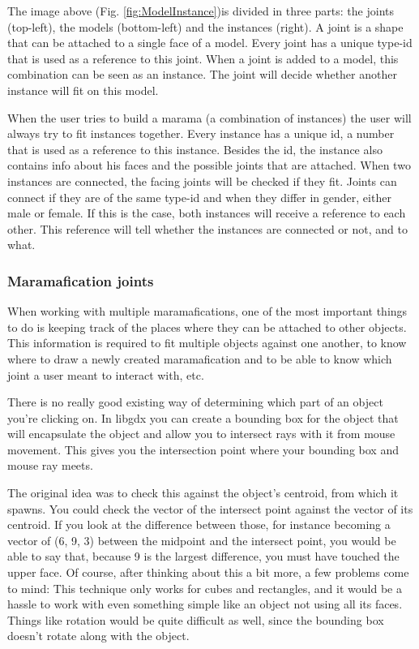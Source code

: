 \documentclass[10pt]{extarticle} %
\begin{document}
    The image above (Fig. \ref{fig:ModelInstance})is divided in three parts: the joints (top-left), the models (bottom-left) and the instances (right).
    A joint is a shape that can be attached to a single face of a model.
    Every joint has a unique type-id that is used as a reference to this joint.
    When a joint is added to a model, this combination can be seen as an instance.
    The joint will decide whether another instance will fit on this model.

    When the user tries to build a marama (a combination of instances) the user will always try to fit instances together.
    Every instance has a unique id, a number that is used as a reference to this instance.
    Besides the id, the instance also contains info about his faces and the possible joints that are attached.
    When two instances are connected, the facing joints will be checked if they fit.
    Joints can connect if they are of the same type-id and when they differ in gender, either male or female.
    If this is the case, both instances will receive a reference to each other.
    This reference will tell whether the instances are connected or not, and to what.

    \subsubsection{Maramafication joints}
    When working with multiple maramafications, one of the most important things to do is keeping track of the places where they can be attached to other objects.
    This information is required to fit multiple objects against one another, to know where to draw a newly created maramafication and to be able to know which joint a user meant to interact with, etc.

    There is no really good existing way of determining which part of an object you're clicking on.
    In libgdx you can create a bounding box for the object that will encapsulate the object and allow you to intersect rays with it from mouse movement.
    This gives you the intersection point where your bounding box and mouse ray meets.

    The original idea was to check this against the object's centroid, from which it spawns.
    You could check the vector of the intersect point against the vector of its centroid.
    If you look at the difference between those, for instance becoming a vector of (6, 9, 3) between the midpoint and the intersect point, you would be able to say that, because 9 is the largest difference, you must have touched the upper face.
    Of course, after thinking about this a bit more, a few problems come to mind:
    This technique only works for cubes and rectangles, and it would be a hassle to work with even something simple like an object not using all its faces.
    Things like rotation would be quite difficult as well, since the bounding box doesn't rotate along with the object.
\end{document}

